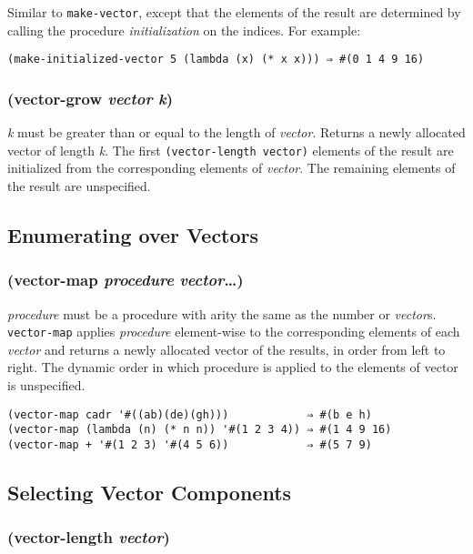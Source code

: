\documentclass{article}
\begin{document}
Similar to \verb|make-vector|, except that the elements of the result are
determined by calling the procedure \emph{initialization} on the indices. For
example:

\begin{verbatim}
(make-initialized-vector 5 (lambda (x) (* x x))) ⇒ #(0 1 4 9 16)
\end{verbatim}

\subsubsection{(vector-grow \emph{vector} \emph{k})}

\emph{k} must be greater than or equal to the length of \emph{vector}. Returns a newly
allocated vector of length \emph{k}. The first \verb|(vector-length vector)| elements of the
result are initialized from the corresponding elements of \emph{vector}. The remaining
elements of the result are unspecified.

\subsection{Enumerating over Vectors}\label{sec:enumerating-over-vectors}

\subsubsection{(vector-map \emph{procedure} \emph{vector}\ldots{})}

\emph{procedure} must be a procedure with arity the same as the number or \emph{vector}s.
\verb|vector-map| applies \emph{procedure} element-wise to the corresponding elements of
each \emph{vector} and returns a newly allocated vector of the results, in order from left to
right. The dynamic order in which procedure is applied to the elements of vector is
unspecified.

\begin{verbatim}
(vector-map cadr '#((ab)(de)(gh)))            ⇒ #(b e h)
(vector-map (lambda (n) (* n n)) '#(1 2 3 4)) ⇒ #(1 4 9 16)
(vector-map + '#(1 2 3) '#(4 5 6))            ⇒ #(5 7 9)
\end{verbatim}

\subsection{Selecting Vector Components}\label{sec:selecting-vector-components}

\subsubsection{(vector-length \emph{vector})}
\end{document}
